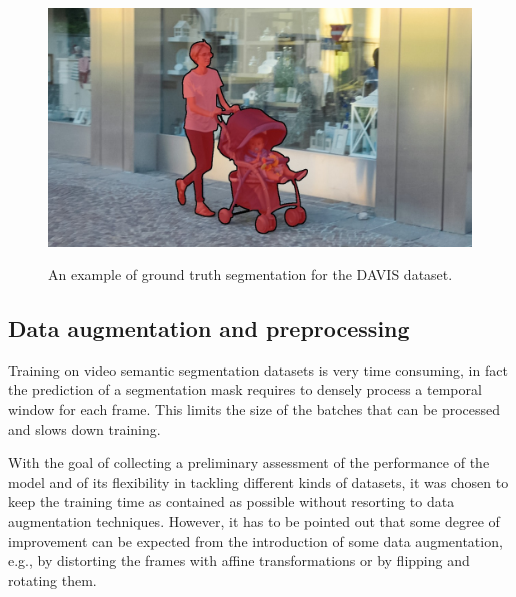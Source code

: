 \begin{figure}[t]
    \includegraphics[width=0.3\columnwidth]{img/deconvLSTM/davis_gt9.jpg}\\
    \caption{An example of ground truth segmentation for the DAVIS dataset.}
    \label{fig:deconvLSTM_davis_gt}
\end{figure}





\subsection{Data augmentation and preprocessing}
Training on video semantic segmentation datasets is very time consuming, in
fact the prediction of a segmentation mask requires to densely process a
temporal window for each frame. This limits the size of the batches that can
be processed and slows down training.

With the goal of collecting a preliminary assessment of the performance of the
model and of its flexibility in tackling different kinds of datasets, it was
chosen to keep the training time as contained as possible without resorting to
data augmentation techniques. However, it has to be pointed out that some
degree of improvement can be expected from the introduction of some data
augmentation, e.g., by distorting the frames with affine transformations or by
flipping and rotating them.

